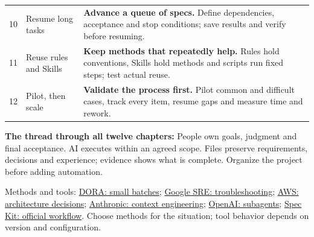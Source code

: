 \begin{tabularx}{\linewidth}{@{}L{8mm}L{43mm}Y@{}}
\textcolor{accent}{\textsf{10}} & Resume long tasks & \textbf{Advance a queue of specs.} Define dependencies, acceptance and stop conditions; save results and verify before resuming.\\[5pt]
\textcolor{accent}{\textsf{11}} & Reuse rules and Skills & \textbf{Keep methods that repeatedly help.} Rules hold conventions, Skills hold methods and scripts run fixed steps; test actual reuse.\\[5pt]
\textcolor{accent}{\textsf{12}} & Pilot, then scale & \textbf{Validate the process first.} Pilot common and difficult cases, track every item, resume gaps and measure time and rework.\\[5pt]
\bottomrule\end{tabularx}
\endgroup\par
\vspace{5mm}
\textbf{The thread through all twelve chapters:} People own goals, judgment and final acceptance. AI executes within an agreed scope. Files preserve requirements, decisions and experience; evidence shows what is complete. Organize the project before adding automation.
\par\smallskip
{\footnotesize\color{muted}Methods and tools: \href{https://dora.dev/capabilities/working-in-small-batches/}{DORA: small batches}; \href{https://sre.google/sre-book/effective-troubleshooting/}{Google SRE: troubleshooting}; \href{https://docs.aws.amazon.com/prescriptive-guidance/latest/architectural-decision-records/adr-process.html}{AWS: architecture decisions}; \href{https://www.anthropic.com/research/effective-context-engineering-for-ai-agents}{Anthropic: context engineering}; \href{https://learn.chatgpt.com/docs/agent-configuration/subagents}{OpenAI: subagents}; \href{https://github.github.io/spec-kit/quickstart.html}{Spec Kit: official workflow}. Choose methods for the situation; tool behavior depends on version and configuration.}
